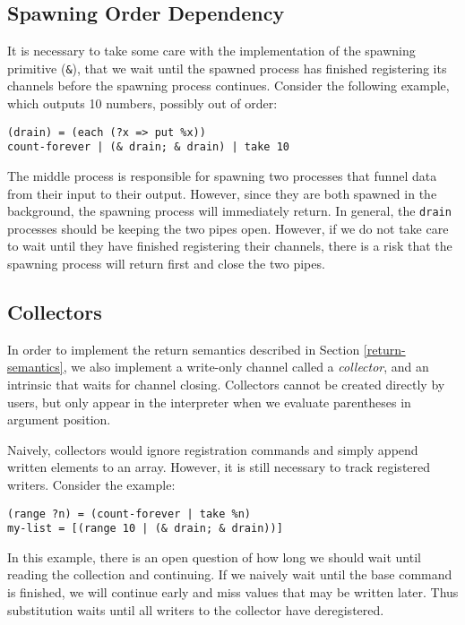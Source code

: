 \ifsigpro{ \documentclass[english,PRO]{ipsj} }
\begin{document}
\subsection{Spawning Order Dependency}\noindent
It is necessary to take some care with the implementation of the spawning primitive (\verb/&/), that we wait until the spawned process has finished registering its channels before the spawning process continues. %
Consider the following example, which outputs 10 numbers, possibly out of order:
\begin{lstlisting}
(drain) = (each (?x => put %x))
count-forever | (& drain; & drain) | take 10
\end{lstlisting}
\noindent
The middle process is responsible for spawning two processes that funnel data from their input to their output. However, since they are both spawned in the background, the spawning process will immediately return. In general, the \verb/drain/ processes should be keeping the two pipes open. However, if we do not take care to wait until they have finished registering their channels, there is a risk that the spawning process will return first and close the two pipes.

\subsection{Collectors}\noindent
In order to implement the return semantics described in Section \ref{return-semantics}, we also implement a write-only channel called a \emph{collector}, and an intrinsic that waits for channel closing. Collectors cannot be created directly by users, but only appear in the interpreter when we evaluate parentheses in argument position.

Naively, collectors would ignore registration commands and simply append written elements to an array. However, it is still necessary to track registered writers. Consider the example:
\begin{lstlisting}
(range ?n) = (count-forever | take %n)
my-list = [(range 10 | (& drain; & drain))]
\end{lstlisting}

\noindent
In this example, there is an open question of how long we should wait until reading the collection and continuing. If we naively wait until the base command is finished, we will continue early and miss values that may be written later. Thus substitution waits until all writers to the collector have deregistered.
\end{document}
